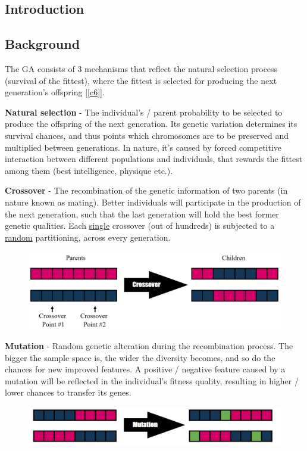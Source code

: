 \documentclass[12pt]{article}
\numberwithin{equation}{section}
\begin{document}
\begin{flushleft}
\section{Introduction} 

\subsection{Background} \label{Background}

The GA consists of 3 mechanisms that reflect the natural selection process (survival of the fittest), where the fittest is selected for producing the next generation's offspring [\ref{c6}].

\textbf{Natural selection} - The individual's / parent probability to be selected to produce the offspring of the next generation. Its genetic variation determines its survival chances, and thus points which chromosomes are to be preserved and multiplied between generations. In nature, it's caused by forced competitive interaction between different populations and individuals, that rewards the fittest among them (best intelligence, physique etc.). 

\textbf{Crossover} - The recombination of the genetic information of two parents (in nature known as mating). Better individuals will participate in the production of the next generation, such that the last generation will hold the best former genetic qualities. Each \underline{single} crossover (out of hundreds) is subjected to a \underline{random} partitioning, across every generation.

\begin{figure}[H]
\centering
\includegraphics[scale=0.29]{q_10.png}
\end{figure}
\textbf{Mutation} - Random genetic alteration during the recombination process. The bigger the sample space is, the wider the diversity becomes, and so do the chances for new improved features. A positive / negative feature caused by a mutation will be reflected in the individual's fitness quality, resulting in higher / lower chances to transfer its genes. \newline
\begin{figure}[H]
\centering
\includegraphics[scale=0.375]{q_11.png}
\end{figure}


\end{flushleft}
\end{document}
